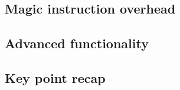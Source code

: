 \documentclass{beamer}
\begin{document}
	\subsection{Magic instruction overhead}
	
	\subsection{Advanced functionality}
	
	\subsection{Key point recap}
	


	

\end{document}
